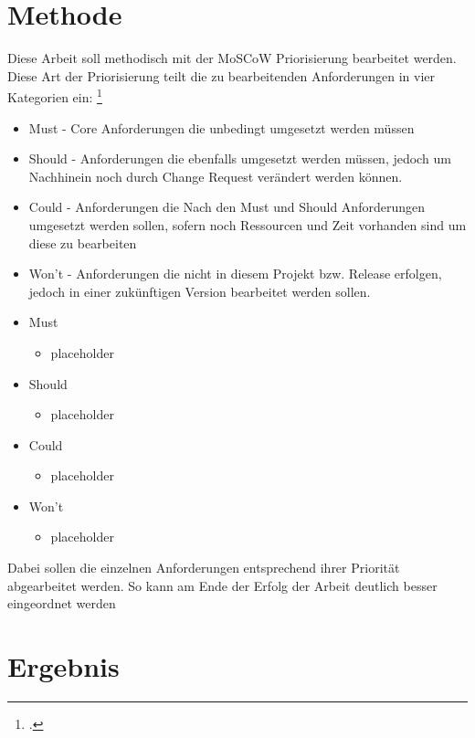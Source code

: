 \documentclass[12pt, a4paper]{scrbook}
\begin{document}
\chapter{Methode}
Diese Arbeit soll methodisch mit der MoSCoW Priorisierung bearbeitet werden. Diese Art der Priorisierung teilt die zu bearbeitenden Anforderungen in vier Kategorien ein:
\footcite[vgl.][90]{Projektmanagement}
\begin{itemize}
\item Must - Core Anforderungen die unbedingt umgesetzt werden müssen
\item Should - Anforderungen die ebenfalls umgesetzt werden müssen, jedoch um Nachhinein noch durch Change Request verändert werden können.
\item Could - Anforderungen die Nach den Must und Should Anforderungen umgesetzt werden sollen, sofern noch Ressourcen und Zeit vorhanden sind um diese zu bearbeiten
\item Won't - Anforderungen die nicht in diesem Projekt bzw. Release erfolgen, jedoch in einer zukünftigen Version bearbeitet werden sollen. 
\end{itemize}


\begin{itemize}
\item Must
\begin{itemize}
\item placeholder
\end{itemize}
\item Should
\begin{itemize}
\item placeholder
\end{itemize}
\item Could
\begin{itemize}
\item placeholder
\end{itemize}
\item Won't
\begin{itemize}
\item placeholder
\end{itemize}
\end{itemize}
Dabei sollen die einzelnen Anforderungen entsprechend ihrer Priorität abgearbeitet werden. So kann am Ende der Erfolg der Arbeit deutlich besser eingeordnet werden

\let\cleardoublepage\relax
\chapter{Ergebnis}
\end{document}
